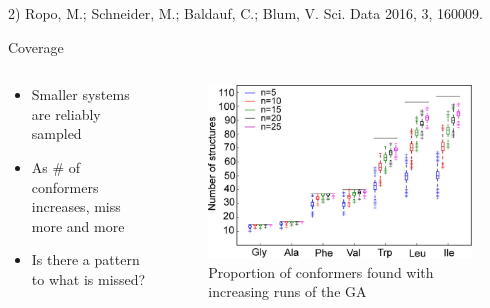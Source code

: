 \documentclass[10pt]{beamer}
\begin{document}
{{{{2) Ropo, M.; Schneider, M.; Baldauf, C.; Blum, V. Sci. Data 2016, 3, 160009.
}
\begin{frame}{Coverage}
	\begin{columns}[c] %
		\begin{column}{.4\textwidth}
			\begin{itemize}
				\item {Smaller systems are reliably sampled}
				\item {As \# of conformers increases, miss more and more}
				\item {Is there a pattern to what is missed?}
			\end{itemize}
		\end{column}
		\hfill
		\begin{column}{0.6\textwidth}
			\begin{figure}
				\includegraphics[width=\linewidth]{images/Supady4.png}
				\caption*{Proportion of conformers found with increasing runs of the GA}
			\end{figure}
		\end{column}
	\end{columns}
\end{frame}
}

}}
\end{document}
